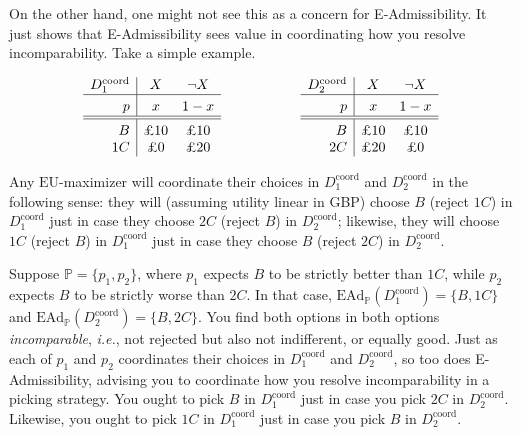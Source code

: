\documentclass[a4paper]{article}
\newcommand\Tstrut{\rule{0pt}{2.6ex}}       %
\newcommand\Bstrut{\rule[-0.9ex]{0pt}{0pt}} %
\renewcommand\P{\mathbb{P}} %
\newcommand\EU{\mathrm{EU}}
\newcommand\EAd{\mathrm{EAd}}
\newcommand{\IP}{\P}
\newcommand{\todoold}[2][]{\todo[backgroundcolor=white,bordercolor=orange!10,linecolor=gray!10, #1,caption={},textcolor=gray]{Pre-rev: #2}}
\renewcommand{\color}[1]{}
\newenvironment{CCM rewritten}
{\begingroup\color{blue}} %
{\endgroup}              %
\begin{document}
	
	On the other hand, one might not see this as a concern for E-Admissibility. %
It just shows that E-Admissibility sees value in coordinating how you resolve incomparability.
Take a simple example.
	
	\label{eg:coord}
	$$
	\begin{array}{r|cc}
		D^{\mathrm{coord}}_1 & X & \neg X  \Bstrut \\\hline \Tstrut		p & x & 1-x \Bstrut \\\hline \hline\Tstrut 
		B & \text{\pounds 10} & \text{\pounds 10}   \\
		1C & \text{\pounds 0} & \text{\pounds 20} 
	\end{array}\hspace{20mm}
	\begin{array}{r|cc}
		D^{\mathrm{coord}}_2 & X & \neg X  \Bstrut \\\hline \Tstrut		p & x & 1-x \Bstrut \\\hline \hline\Tstrut 
		B & \text{\pounds 10} & \text{\pounds 10}   \\
		2C & \text{\pounds 20} & \text{\pounds 0} 
	\end{array}
	$$
	
	Any $\EU$-maximizer will coordinate their choices in $D^{\mathrm{coord}}_1$ and $D^{\mathrm{coord}}_2$ in the following sense: they will (assuming utility linear in GBP) choose $B$ (reject $1C$) in $D^{\mathrm{coord}}_1$ just in case they choose $2C$ (reject $B$) in $D^{\mathrm{coord}}_2$; likewise, they will choose $1C$ (reject $B$) in $D^{\mathrm{coord}}_1$ just in case they choose $B$ (reject $2C$) in $D^{\mathrm{coord}}_2$. 
	
	Suppose $\IP = \{p_1, p_2\}$, where $p_1$ expects $B$ to be strictly better than $1C$, while $p_2$ expects $B$ to be strictly worse than $2C$. In that case, $\EAd_\IP(D^{\mathrm{coord}}_1)=\{B,1C\}$ and $\EAd_\IP(D^{\mathrm{coord}}_2)=\{B,2C\}$. You find both options in both options \emph{incomparable}, \emph{i.e.}, not rejected but also not indifferent, or equally good. Just as each of $p_1$ and $p_2$ coordinates their choices in $D^{\mathrm{coord}}_1$ and $D^{\mathrm{coord}}_2$, so too does E-Admissibility, advising you to coordinate how you resolve incomparability in a picking strategy. You ought to pick $B$ in $D^{\mathrm{coord}}_1$ just in case you pick $2C$ in $D^{\mathrm{coord}}_2$. Likewise, you ought to pick $1C$ in $D^{\mathrm{coord}}_1$ just in case you pick $B$ in $D^{\mathrm{coord}}_2$. 
\end{document}
